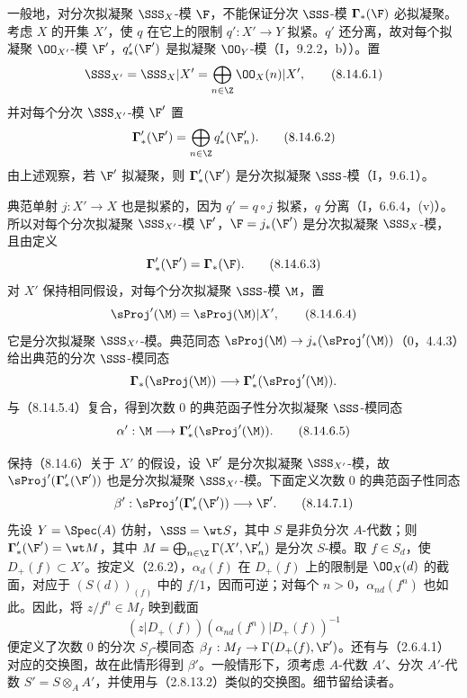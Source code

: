  一般地，对分次拟凝聚 $\SSS_X$-模 $\F$，不能保证分次 $\SSS$-模 $\boldsymbol\Gamma_*(\F)$ 必拟凝聚。考虑 $X$ 的开集 $X'$，使 $q$ 在它上的限制 $q':X'\to Y$ 拟紧。$q'$ 还分离，故对每个拟凝聚 $\OO_{X'}$-模 $\F'$，$q'_*(\F')$ 是拟凝聚 $\OO_Y$-模（I，9.2.2，b））。置
\begin{equation}\SSS_{X'}=\SSS_X|X'=\bigoplus_{n\in\Z}\OO_X(n)|X',\tag{8.14.6.1}\end{equation}
并对每个分次 $\SSS_{X'}$-模 $\F'$ 置
\begin{equation}\boldsymbol\Gamma'_*(\F')=\bigoplus_{n\in\Z}q'_*(\F'_n).\tag{8.14.6.2}\end{equation}
由上述观察，若 $\F'$ 拟凝聚，则 $\boldsymbol\Gamma'_*(\F')$ 是分次拟凝聚 $\SSS$-模（I，9.6.1）。

典范单射 $j:X'\to X$ 也是拟紧的，因为 $q'=q\circ j$ 拟紧，$q$ 分离（I，6.6.4，(v)）。所以对每个分次拟凝聚 $\SSS_{X'}$-模 $\F'$，$\F=j_*(\F')$ 是分次拟凝聚 $\SSS_X$-模，且由定义
\begin{equation}\boldsymbol\Gamma'_*(\F')=\boldsymbol\Gamma_*(\F).\tag{8.14.6.3}\end{equation}
对 $X'$ 保持相同假设，对每个分次拟凝聚 $\SSS$-模 $\M$，置
\begin{equation}\sProj'(\M)=\sProj(\M)|X',\tag{8.14.6.4}\end{equation}
它是分次拟凝聚 $\SSS_{X'}$-模。典范同态 $\sProj(\M)\to j_*(\sProj'(\M))$（0，4.4.3）给出典范的分次 $\SSS$-模同态
\[\boldsymbol\Gamma_*(\sProj(\M))\longrightarrow\boldsymbol\Gamma'_*(\sProj'(\M)).\]
与（8.14.5.4）复合，得到次数 $0$ 的典范函子性分次拟凝聚 $\SSS$-模同态
\begin{equation}\alpha':\M\longrightarrow\boldsymbol\Gamma'_*(\sProj'(\M)).\tag{8.14.6.5}\end{equation}

 保持（8.14.6）关于 $X'$ 的假设，设 $\F'$ 是分次拟凝聚 $\SSS_{X'}$-模，故 $\sProj'(\boldsymbol\Gamma'_*(\F'))$ 也是分次拟凝聚 $\SSS_{X'}$-模。下面定义次数 $0$ 的典范函子性同态
\begin{equation}\beta':\sProj'(\boldsymbol\Gamma'_*(\F'))\longrightarrow\F'.\tag{8.14.7.1}\end{equation}
先设 $Y=\Spec(A)$ 仿射，$\SSS=\wt S$，其中 $S$ 是非负分次 $A$-代数；则 $\boldsymbol\Gamma'_*(\F')=\wt M$，其中 $M=\bigoplus_{n\in\Z}\Gamma(X',\F'_n)$ 是分次 $S$-模。取 $f\in S_d$，使 $D_+(f)\subset X'$。按定义（2.6.2），$\alpha_d(f)$ 在 $D_+(f)$ 上的限制是 $\OO_X(d)$ 的截面，对应于 $(S(d))_{(f)}$ 中的 $f/1$，因而可逆；对每个 $n>0$，$\alpha_{nd}(f^n)$ 也如此。因此，将 $z/f^n\in M_f$ 映到截面
\[(z|D_+(f))(\alpha_{nd}(f^n)|D_+(f))^{-1}\]
便定义了次数 $0$ 的分次 $S_f$-模同态 $\beta_f:M_f\to\Gamma(D_+(f),\F')$。还有与（2.6.4.1）对应的交换图，故在此情形得到 $\beta'$。一般情形下，须考虑 $A$-代数 $A'$、分次 $A'$-代数 $S'=S\otimes_A A'$，并使用与（2.8.13.2）类似的交换图。细节留给读者。

